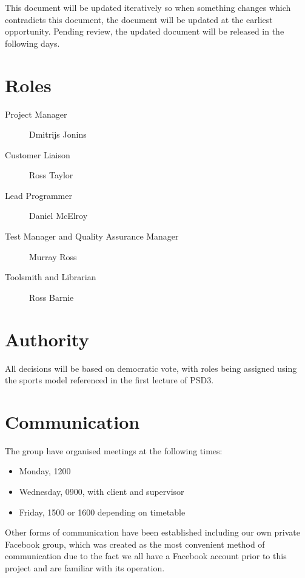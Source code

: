 \documentclass{l3deliverable}
\begin{document}
This document will be updated iteratively so when something changes which
contradicts this document, the document will be updated at the earliest
opportunity.
Pending review, the updated document will be released in the following days.


\section{Roles}

\begin{description}
  \item[Project Manager] Dmitrijs Jonins
  \item[Customer Liaison] Ross Taylor
  \item[Lead Programmer] Daniel McElroy
  \item[Test Manager and Quality Assurance Manager] Murray Ross
  \item[Toolsmith and Librarian] Ross Barnie
\end{description}


\section{Authority}

All decisions will be based on democratic vote, with roles being
assigned using the sports model referenced in the first lecture of PSD3.


\section{Communication}

The group have organised meetings at the following times:

\begin{itemize}
\item{Monday, 1200}
\item{Wednesday, 0900, with client and supervisor}
\item{Friday, 1500 or 1600 depending on timetable}
\end{itemize}

Other forms of communication have been established including our own
private Facebook group, which was created as the most convenient method
of communication due to the fact we all have a Facebook account prior to
this project and are familiar with its operation.
 
\end{document}
